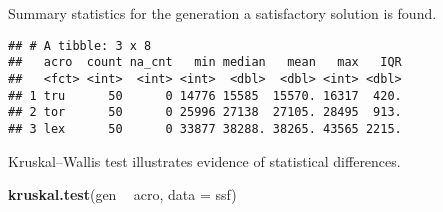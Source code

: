 \documentclass[]{book}
\newenvironment{Shaded}{\begin{snugshade}}{\end{snugshade}}
\newcommand{\DataTypeTok}[1]{\textcolor[rgb]{0.13,0.29,0.53}{#1}}
\newcommand{\KeywordTok}[1]{\textcolor[rgb]{0.13,0.29,0.53}{\textbf{#1}}}
\newcommand{\NormalTok}[1]{#1}
\newcommand{\OperatorTok}[1]{\textcolor[rgb]{0.81,0.36,0.00}{\textbf{#1}}}
\newcommand{\OtherTok}[1]{\textcolor[rgb]{0.56,0.35,0.01}{#1}}
\newcommand{\StringTok}[1]{\textcolor[rgb]{0.31,0.60,0.02}{#1}}
\begin{document}
Summary statistics for the generation a satisfactory solution is found.

\begin{Shaded}
\end{Shaded}

\begin{verbatim}
## # A tibble: 3 x 8
##   acro  count na_cnt   min median   mean   max   IQR
##   <fct> <int>  <int> <int>  <dbl>  <dbl> <int> <dbl>
## 1 tru      50      0 14776 15585  15570. 16317  420.
## 2 tor      50      0 25996 27138  27105. 28495  913.
## 3 lex      50      0 33877 38288. 38265. 43565 2215.
\end{verbatim}

Kruskal--Wallis test illustrates evidence of statistical differences.

\begin{Shaded}
\begin{Highlighting}[]
\KeywordTok{kruskal.test}\NormalTok{(gen }\OperatorTok{~}\StringTok{ }\NormalTok{acro, }\DataTypeTok{data =}\NormalTok{ ssf)}
\end{Highlighting}
\end{Shaded}
\end{document}
